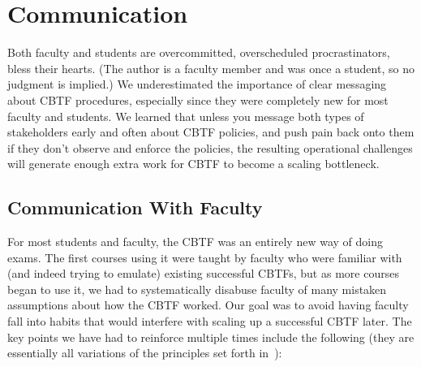 \section{Communication}

Both faculty and students are 
overcommitted, overscheduled procrastinators, bless their hearts.
(The author is a faculty member and was once a student, so no judgment
is implied.)  We underestimated the importance of clear messaging
about CBTF procedures, especially since they were completely new for
most faculty and students.
We learned that unless you message both types of stakeholders early and often
about CBTF policies, and push pain back onto them if they don't
observe and enforce the policies, the resulting operational challenges
will generate enough extra work for CBTF to become a scaling bottleneck.

\subsection{Communication With Faculty}


For most students and faculty, the CBTF was an entirely new way of
doing exams.  The first courses using it were taught by faculty who
were familiar with (and indeed trying to emulate) existing successful
CBTFs, but as more courses began to use it, we had to systematically
disabuse faculty of many mistaken assumptions about how the CBTF
worked.
Our goal was to avoid having faculty fall into habits that would
interfere with scaling up a successful CBTF later.  The key points we
have had to reinforce multiple times include the following (they are
essentially all variations of the principles set forth in~\cite{fox-cbtf-not-proctoring}):

